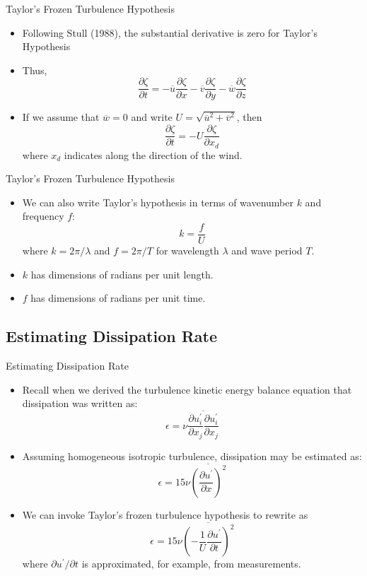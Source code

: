 \begin{frame}{Taylor's Frozen Turbulence Hypothesis}

\begin{itemize}
	\item Following Stull (1988), the substantial derivative is zero for Taylor's Hypothesis
	\item Thus, $$\frac{\partial \zeta}{\partial t} = -\overline{u}\frac{\partial \zeta}{\partial x}-\overline{v}\frac{\partial \zeta}{\partial y}-\overline{w}\frac{\partial \zeta}{\partial z}$$
	\item If we assume that $\overline{w}=0$ and write $U = \sqrt{\overline{u}^2 + \overline{v}^2}$, then
	$$\frac{\partial \zeta}{\partial t} = -U\frac{\partial \zeta}{\partial x_d}$$
	where $x_d$ indicates along the direction of the wind.
\end{itemize}
\end{frame}
\begin{frame}{Taylor's Frozen Turbulence Hypothesis}

\begin{itemize}
	\item We can also write Taylor's hypothesis in terms of wavenumber $k$ and frequency $f$:
	$$k = \frac{f}{U}$$
	where $k = 2\pi/\lambda$ and $f=2\pi/T$ for wavelength $\lambda$ and wave period $T$.
	\item $k$ has dimensions of radians per unit length.
	\item $f$ has dimensions of radians per unit time.
\end{itemize}
\end{frame}
\subsection{Estimating Dissipation Rate} %
\begin{frame}{Estimating Dissipation Rate}

\begin{itemize}
	\item Recall when we derived the turbulence kinetic energy balance equation that dissipation was written as:
	$$\epsilon = \nu \overline{\frac{\partial u_i^\prime}{\partial x_j}\frac{\partial u_i^\prime}{\partial x_j}}$$
	\item Assuming homogeneous isotropic turbulence, dissipation may be estimated as:
	$$\epsilon = 15\nu \overline{\left(\frac{\partial u^\prime}{\partial x}\right)^2}$$
	\item We can invoke Taylor's frozen turbulence hypothesis to rewrite as
	$$\epsilon = 15\nu \overline{\left(-\frac{1}{U}\frac{\partial u^\prime}{\partial t}\right)^2}$$
	where $\partial u^\prime/\partial t$ is approximated, for example, from measurements.
\end{itemize}
\end{frame}

